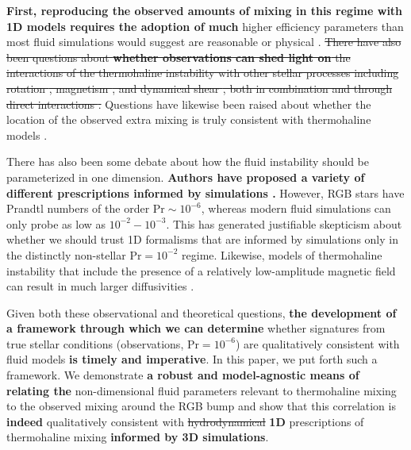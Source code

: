 \textbf{First, reproducing the observed amounts of mixing in this regime with 1D models requires the adoption of much} higher efficiency parameters than most fluid simulations would suggest are reasonable or physical \citep{Denissenkov2010thermohaline, denissenkov_merryfield_2011, traxler_etal_2011, brown_etal_2013}. \sout{There have also been questions about \textbf{whether observations can shed light on} the interactions of the thermohaline instability with other stellar processes including rotation \citep{Lagarde2011}, magnetism \citep{harrington}, and
dynamical shear \citep{CantielloLanger2010}, both in combination and through direct interactions 
\citep{Maeder2013, SenguptaGaraud2018, harrington}.}
Questions have likewise been raised about whether the location of the observed extra mixing is truly consistent with thermohaline models \citep[see e.g.][]{Angelou2015, Henkel2017, TayarJoyce22}.

There has also been some debate about how the fluid instability should be parameterized in one dimension. \textbf{Authors have proposed a variety of different prescriptions informed by simulations \citep[e.g.~][]{traxler_etal_2011,brown_etal_2013}.} However, RGB stars have Prandtl numbers of the order $\mathrm{Pr} \sim 10^{-6}$, whereas modern fluid simulations can only probe as low as $10^{-2} - 10^{-3}$. This has generated justifiable skepticism about whether we should trust 1D formalisms that are informed by simulations only in the distinctly non-stellar $\mathrm{Pr} = 10^{-2}$ regime.  Likewise, models of thermohaline instability that include the presence of a relatively low-amplitude magnetic field can result in much larger diffusivities \citep{harrington}. 

Given both these observational and theoretical questions, \textbf{the development of a framework through which we can determine} whether signatures from true stellar conditions (observations, $\mathrm{Pr} = 10^{-6}$) are qualitatively consistent with fluid models \textbf{is timely and imperative}. In this paper, we put forth such a framework. We demonstrate \textbf{a robust and model-agnostic means of relating the} non-dimensional fluid parameters relevant to thermohaline mixing to the observed mixing around the RGB bump and show that this correlation is \textbf{indeed} qualitatively consistent with \sout{hydrodynamical} \textbf{1D} prescriptions of thermohaline mixing \textbf{informed by 3D simulations}.

